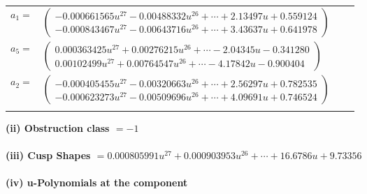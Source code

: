\documentclass[1p]{elsarticle_modified}
\theoremstyle{definition}
\begin{document}
\begin{tabular}{m{7pt} m{180pt} m{7pt} m{180pt} }
\flushright $a_{1}=$&$\begin{pmatrix}-0.000661565 u^{27}-0.00488332 u^{26}+\cdots+2.13497 u+0.559124\\-0.000843467 u^{27}-0.00643716 u^{26}+\cdots+3.43637 u+0.641978\end{pmatrix}$ \\
\flushright $a_{5}=$&$\begin{pmatrix}0.000363425 u^{27}+0.00276215 u^{26}+\cdots-2.04345 u-0.341280\\0.00102499 u^{27}+0.00764547 u^{26}+\cdots-4.17842 u-0.900404\end{pmatrix}$ \\
\flushright $a_{2}=$&$\begin{pmatrix}-0.000405455 u^{27}-0.00320663 u^{26}+\cdots+2.56297 u+0.782535\\-0.000623273 u^{27}-0.00509696 u^{26}+\cdots+4.09691 u+0.746524\end{pmatrix}$\\&\end{tabular}
\flushleft \textbf{(ii) Obstruction class $= -1$}\\~\\
\flushleft \textbf{(iii) Cusp Shapes $= 0.000805991 u^{27}+0.000903953 u^{26}+\cdots+16.6786 u+9.73356$}\\~\\
\newpage\renewcommand{\arraystretch}{1}
\flushleft \textbf{(iv) u-Polynomials at the component}\newline \\
\end{document}
